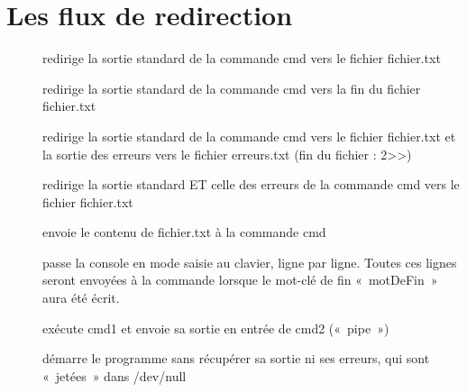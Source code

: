 \documentclass[letterpaper,10pt,french]{sphinxmanual}
\begin{document}
\chapter{Les flux de redirection}
\label{\detokenize{04-redirection:les-flux-de-redirection}}\label{\detokenize{04-redirection::doc}}\begin{description}
\item[{}] \leavevmode
redirige la sortie standard de la commande cmd vers le fichier fichier.txt

\item[{}] \leavevmode
redirige la sortie standard de la commande cmd vers la fin du fichier fichier.txt

\item[{}] \leavevmode
redirige la sortie standard de la commande cmd vers le fichier fichier.txt et la sortie des erreurs vers le fichier erreurs.txt (fin du fichier : 2\textgreater{}\textgreater{})

\item[{}] \leavevmode
redirige la sortie standard ET celle des erreurs de la commande cmd vers le fichier fichier.txt

\item[{}] \leavevmode
envoie le contenu de fichier.txt à la commande cmd

\item[{}] \leavevmode
passe la console en mode saisie au clavier, ligne par ligne. Toutes ces lignes seront envoyées à la commande lorsque le mot-clé de fin « motDeFin » aura été écrit.

\item[{}] \leavevmode
exécute cmd1 et envoie sa sortie en entrée de cmd2 (« pipe »)

\item[{}] \leavevmode
démarre le programme sans récupérer sa sortie ni ses erreurs, qui sont « jetées » dans /dev/null

\end{description}
\end{document}
